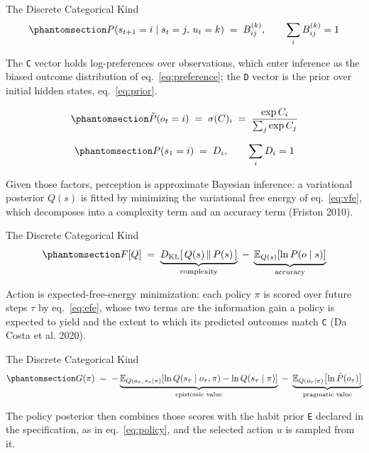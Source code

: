 \documentclass[
  ignorenonframetext,
]{beamer}
\begin{document}
\begin{frame}{The Discrete Categorical Kind}
\begin{equation}\protect\phantomsection\label{eq:transition}{
P(s_{t+1} = i \mid s_t = j,\, u_t = k) \;=\; B^{(k)}_{ij}, \qquad \sum_i B^{(k)}_{ij} = 1
}\end{equation}

The \texttt{C} vector holds log-preferences over observations, which
enter inference as the biased outcome distribution of
eq.~\ref{eq:preference}; the \texttt{D} vector is the prior over initial
hidden states, eq.~\ref{eq:prior}.

\begin{equation}\protect\phantomsection\label{eq:preference}{
\tilde{P}(o_t = i) \;=\; \sigma(C)_i \;=\; \frac{\exp C_i}{\sum_j \exp C_j}
}\end{equation}

\begin{equation}\protect\phantomsection\label{eq:prior}{
P(s_1 = i) \;=\; D_i, \qquad \sum_i D_i = 1
}\end{equation}

Given those factors, perception is approximate Bayesian inference: a
variational posterior \(Q(s)\) is fitted by minimizing the variational
free energy of eq.~\ref{eq:vfe}, which decomposes into a complexity term
and an accuracy term (Friston 2010).

\end{frame}

\begin{frame}{The Discrete Categorical Kind}
\begin{equation}\protect\phantomsection\label{eq:vfe}{
F[Q] \;=\; \underbrace{D_{\mathrm{KL}}\!\left[\,Q(s) \,\|\, P(s)\,\right]}_{\text{complexity}} \;-\; \underbrace{\mathbb{E}_{Q(s)}\!\left[\ln P(o \mid s)\right]}_{\text{accuracy}}
}\end{equation}

Action is expected-free-energy minimization: each policy \(\pi\) is
scored over future steps \(\tau\) by eq.~\ref{eq:efe}, whose two terms
are the information gain a policy is expected to yield and the extent to
which its predicted outcomes match \texttt{C} (Da Costa et al. 2020).

\end{frame}

\begin{frame}{The Discrete Categorical Kind}
\begin{equation}\protect\phantomsection\label{eq:efe}{
G(\pi) \;=\; -\underbrace{\mathbb{E}_{Q(o_\tau,\, s_\tau \mid \pi)}\!\left[\ln Q(s_\tau \mid o_\tau, \pi) - \ln Q(s_\tau \mid \pi)\right]}_{\text{epistemic value}} \;-\; \underbrace{\mathbb{E}_{Q(o_\tau \mid \pi)}\!\left[\ln \tilde{P}(o_\tau)\right]}_{\text{pragmatic value}}
}\end{equation}

The policy posterior then combines those scores with the habit prior
\texttt{E} declared in the specification, as in eq.~\ref{eq:policy}, and
the selected action \(u\) is sampled from it.

\end{frame}
\end{document}
